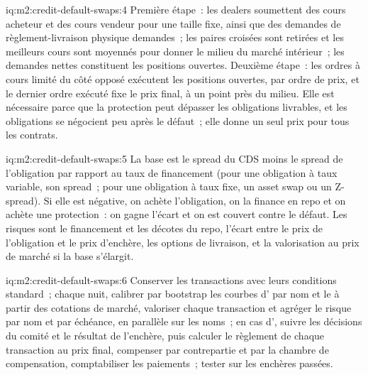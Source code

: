 \begin{solution}{iq:m2:credit-default-swaps:4}
Première étape~: les dealers soumettent des cours acheteur et des cours vendeur pour une taille fixe, ainsi que des demandes de règlement-livraison physique
demandes~; les paires croisées sont retirées et les meilleurs cours sont moyennés pour donner le milieu du
marché intérieur~; les demandes nettes constituent les positions ouvertes. Deuxième étape~: les ordres à cours limité
du côté opposé exécutent les positions ouvertes, par ordre de prix, et le dernier ordre exécuté fixe
le prix final, à un point près du milieu. Elle est nécessaire parce que la protection peut
dépasser les obligations livrables, et les obligations se négocient peu après le défaut~; elle donne un seul prix pour
tous les contrats.
\end{solution}

\begin{solution}{iq:m2:credit-default-swaps:5}
La base est le spread du CDS moins le spread de l'obligation par rapport au taux de financement
(pour une obligation à taux variable, son spread~; pour une obligation à taux fixe, un asset swap
ou un Z-spread). Si elle est négative, on achète l'obligation, on la finance en repo et on achète
une protection~: on gagne l'écart et on est couvert contre le défaut. Les risques sont le financement
et les décotes du repo, l'écart entre le prix de l'obligation et le prix d'enchère, les options de
livraison, et la valorisation au prix de marché si la base s'élargit.
\end{solution}

\begin{solution}{iq:m2:credit-default-swaps:6}
Conserver les transactions avec leurs conditions standard~; chaque nuit, calibrer par bootstrap les courbes
d' par nom et le  à partir des cotations de marché, valoriser chaque
transaction et agréger le risque par nom et par échéance, en parallèle sur les noms~; en cas
d', suivre les décisions du comité et le résultat de l'enchère, puis calculer le
règlement de chaque transaction au prix final, compenser par contrepartie et par la chambre de
compensation, comptabiliser les paiements~; tester sur les enchères passées.
\end{solution}
